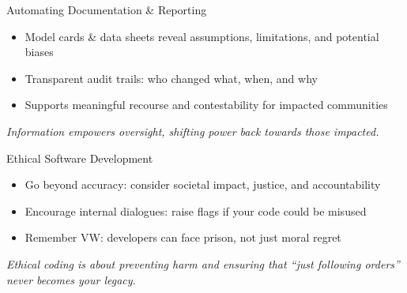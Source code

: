 \documentclass[aspectratio=169]{beamer}
\begin{document}
%
\begin{frame}{Automating Documentation \& Reporting}
\begin{itemize}
\item Model cards \& data sheets reveal assumptions, limitations, and potential biases
\item Transparent audit trails: who changed what, when, and why
\item Supports meaningful recourse and contestability for impacted communities
\end{itemize}

\vspace{0.8em}
\emph{Information empowers oversight, shifting power back towards those impacted.}
\end{frame}

%
%
\begin{frame}{Ethical Software Development}
\begin{itemize}
\item Go beyond accuracy: consider societal impact, justice, and accountability
\item Encourage internal dialogues: raise flags if your code could be misused
\item Remember VW: developers can face prison, not just moral regret
\end{itemize}

\vspace{0.8em}
\emph{Ethical coding is about preventing harm and ensuring that “just following orders” never becomes your legacy.}
\end{frame}
\end{document}
